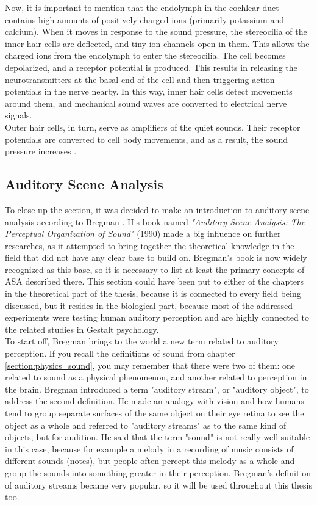 Now, it is important to mention that the endolymph in the cochlear duct contains high amounts of positively charged ions (primarily potassium and calcium). When it moves in response to the sound pressure, the stereocilia of the inner hair cells are deflected, and tiny ion channels open in them. This allows the charged ions from the endolymph to enter the stereocilia. The cell becomes depolarized, and a receptor potential is produced. This results in releasing the neurotransmitters at the basal end of the cell and then triggering action potentials in the nerve nearby. In this way, inner hair cells detect movements around them, and mechanical sound waves are converted to electrical nerve signals.\\

Outer hair cells, in turn, serve as amplifiers of the quiet sounds. Their receptor potentials are converted to cell body movements, and as a result, the sound pressure increases \cite{Hudspeth2008}.

\subsection{Auditory Scene Analysis}\label{section:biology_asa}

To close up the section, it was decided to make an introduction to auditory scene analysis according to Bregman \cite{Bregman1990}. His book named \textit{"Auditory Scene Analysis: The Perceptual Organization of Sound"} (1990) made a big influence on further researches, as it attempted to bring together the theoretical knowledge in the field that did not have any clear base to build on. Bregman's book is now widely recognized as this base, so it is necessary to list at least the primary concepts of ASA described there. This section could have been put to either of the chapters in the theoretical part of the thesis, because it is connected to every field being discussed, but it resides in the biological part, because most of the addressed experiments were testing human auditory perception and are highly connected to the related studies in Gestalt psychology.\\

To start off, Bregman brings to the world a new term related to auditory perception. If you recall the definitions of sound from chapter \ref{section:physics_sound}, you may remember that there were two of them: one related to sound as a physical phenomenon, and another related to perception in the brain. Bregman introduced a term "auditory stream", or "auditory object", to address the second definition. He made an analogy with vision and how humans tend to group separate surfaces of the same object on their eye retina to see the object as a whole and referred to "auditory streams" as to the same kind of objects, but for audition. He said that the term "sound" is not really well suitable in this case, because for example a melody in a recording of music consists of different sounds (notes), but people often percept this melody as a whole and group the sounds into something greater in their perception. Bregman's definition of auditory streams became very popular, so it will be used throughout this thesis too.\\

